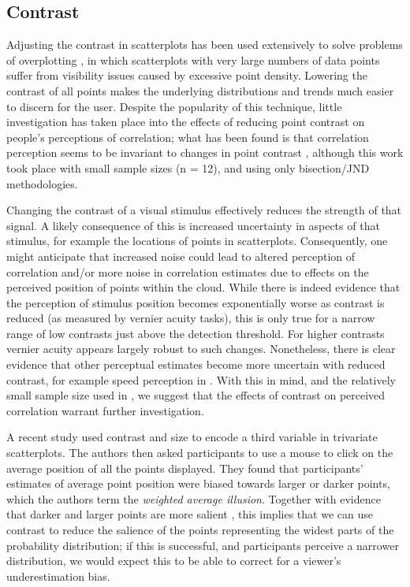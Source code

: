 \documentclass[preprint, 3p,
authoryear]{elsarticle} %
\begin{document}
\hypertarget{contrast}{%
\subsection{Contrast}\label{contrast}}

Adjusting the contrast in scatterplots has been used extensively to
solve problems of overplotting \citep{matejka_2015, bertini_2004}, in
which scatterplots with very large numbers of data points suffer from
visibility issues caused by excessive point density. Lowering the
contrast of all points makes the underlying distributions and trends
much easier to discern for the user. Despite the popularity of this
technique, little investigation has taken place into the effects of
reducing point contrast on people's perceptions of correlation; what has
been found is that correlation perception seems to be invariant to
changes in point contrast \citep{rensink_2012}, although this work took
place with small sample sizes (n = 12), and using only bisection/JND
methodologies.

Changing the contrast of a visual stimulus effectively reduces the
strength of that signal. A likely consequence of this is increased
uncertainty in aspects of that stimulus, for example the locations of
points in scatterplots. Consequently, one might anticipate that
increased noise could lead to altered perception of correlation and/or
more noise in correlation estimates due to effects on the perceived
position of points within the cloud. While there is indeed evidence
\citep{wehrhahn_1990} that the perception of stimulus position becomes
exponentially worse as contrast is reduced (as measured by vernier
acuity tasks), this is only true for a narrow range of low contrasts
just above the detection threshold. For higher contrasts vernier acuity
appears largely robust to such changes. Nonetheless, there is clear
evidence that other perceptual estimates become more uncertain with
reduced contrast, for example speed perception in \citet{champion_2017}.
With this in mind, and the relatively small sample size used in
\citet{rensink_2012}, we suggest that the effects of contrast on
perceived correlation warrant further investigation.

A recent study \citep{hong_2021} used contrast and size to encode a
third variable in trivariate scatterplots. The authors then asked
participants to use a mouse to click on the average position of all the
points displayed. They found that participants' estimates of average
point position were biased towards larger or darker points, which the
authors term the \emph{weighted average illusion}. Together with
evidence that darker and larger points are more salient
\citep{healey_2012}, this implies that we can use contrast to reduce the
salience of the points representing the widest parts of the probability
distribution; if this is successful, and participants perceive a
narrower distribution, we would expect this to be able to correct for a
viewer's underestimation bias.
\end{document}
